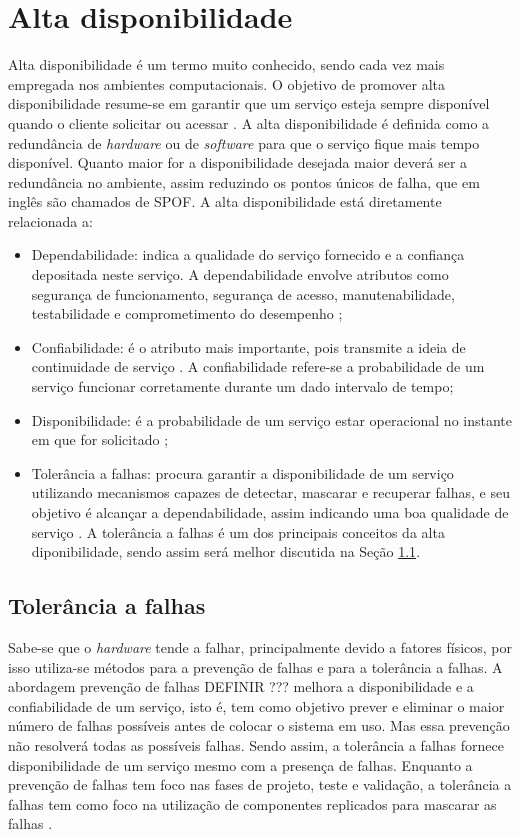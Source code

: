 \chapter{Alta disponibilidade}
\label{cap:altadiponibilidade}

Alta disponibilidade é um termo muito conhecido, sendo cada vez mais empregada nos ambientes computacionais. O objetivo de promover 
alta disponibilidade resume-se em garantir que um serviço esteja sempre disponível quando o cliente solicitar ou acessar \cite{costa2009}.
A alta disponibilidade é definida como a redundância de \textit{hardware} ou de \textit{software} para que o serviço fique mais tempo disponível.
Quanto maior for a disponibilidade desejada maior deverá ser a redundância no ambiente, assim reduzindo os pontos únicos de falha,
que em inglês são chamados de \ac{SPOF}. A alta disponibilidade está diretamente relacionada a: 
\begin{itemize}
 \item Dependabilidade: indica a qualidade do serviço fornecido e a confiança depositada neste serviço. A dependabilidade envolve atributos 
 como segurança de funcionamento, segurança de acesso, manutenabilidade, testabilidade e comprometimento do desempenho \cite{weber2002};
 \item Confiabilidade: é o atributo mais importante, pois transmite a ideia de continuidade de serviço \cite{pankaj1994}. A confiabilidade 
 refere-se a probabilidade de um serviço funcionar corretamente durante um dado intervalo de tempo;
 \item Disponibilidade: é a probabilidade de um serviço estar operacional no instante em que for solicitado \cite{costa2009};
 \item Tolerância a falhas: procura garantir a disponibilidade de um serviço utilizando mecanismos capazes de detectar, mascarar e recuperar 
 falhas, e seu objetivo é alcançar a dependabilidade, assim indicando uma boa qualidade de serviço \cite{costa2009}. A tolerância a falhas é 
 um dos principais conceitos da alta diponibilidade, sendo assim será melhor discutida na Seção \ref{section:toleranciafalhas}.
\end{itemize}

\section{Tolerância a falhas}
\label{section:toleranciafalhas}

Sabe-se que o \textit{hardware} tende a falhar, principalmente devido a fatores físicos, por isso utiliza-se métodos para a prevenção 
de falhas e para a tolerância a falhas. A abordagem prevenção de falhas DEFINIR ??? melhora a disponibilidade e a confiabilidade de um 
serviço, isto é, tem como 
objetivo prever e eliminar o maior número de falhas possíveis antes de colocar o sistema em uso. Mas essa prevenção não resolverá todas 
as possíveis falhas. Sendo assim, a tolerância a falhas fornece disponibilidade de um serviço mesmo com a presença de falhas. Enquanto a 
prevenção de falhas tem foco nas fases de projeto, teste e validação, a tolerância a falhas tem como foco na utilização de componentes 
replicados para mascarar as falhas \cite{pankaj1994}.


